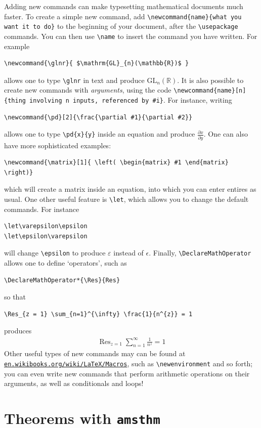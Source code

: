 \documentclass[11pt]{article}
\newcommand{\pd}[2]{\frac{\partial #1}{\partial #2}}
\DeclareMathOperator*{\Res}{Res}
\newcommand{\eqn}[1]{\begin{align*} #1 \end{align*}}
\begin{document}
Adding new commands can make typesetting mathematical documents much faster. To create a simple new command, add \verb$\newcommand{name}{what you want it to do}$ to the beginning of your document, after the \verb$\usepackage$ commands. You can then use \verb$\name$ to insert the command you have written. For example
\begin{verbatim}
\newcommand{\glnr}{ $\mathrm{GL}_{n}(\mathbb{R})$ }
\end{verbatim}
allows one to type \verb$\glnr$ in text and produce $\mathrm{GL}_{n}( \mathbb{R})$. It is also possible to create new commands with \textit{arguments}, using the code \verb$\newcommand{name}[n]{thing involving n inputs, referenced by #i}$. For instance, writing
\begin{verbatim}
\newcommand{\pd}[2]{\frac{\partial #1}{\partial #2}}
\end{verbatim}
allows one to type \verb$\pd{x}{y}$ inside an equation and produce $\pd{x}{y}$. One can also have more sophisticated examples:
\begin{verbatim}
\newcommand{\matrix}[1]{ \left( \begin{matrix} #1 \end{matrix} \right)}
\end{verbatim}
which will create a matrix inside an equation, into which you can enter entires as usual. One other useful feature is \verb$\let$, which allows you to change the default commands. For instance
\begin{verbatim}
\let\varepsilon\epsilon
\let\epsilon\varepsilon
\end{verbatim}
will change \verb$\epsilon$ to produce $\varepsilon$ instead of $\epsilon$. Finally, \verb$\DeclareMathOperator$ allows one to define `operators', such as
\begin{verbatim}
\DeclareMathOperator*{\Res}{Res}
\end{verbatim}
so that
\begin{verbatim}
\Res_{z = 1} \sum_{n=1}^{\infty} \frac{1}{n^{z}} = 1
\end{verbatim}
produces
\eqn{
\Res_{z = 1} \sum_{n=1}^{\infty} \frac{1}{n^{z}} = 1
}
Other useful types of new commands may can be found at \href{https://en.wikibooks.org/wiki/LaTeX/Macros}{\texttt{en.wikibooks.org/wiki/LaTeX/Macros}}, such as \verb$\newenvironment$ and so forth; you can even write new commands that perform arithmetic operations on their arguments, as well as conditionals and loops!

\section{Theorems with \texttt{amsthm}}
\end{document}
